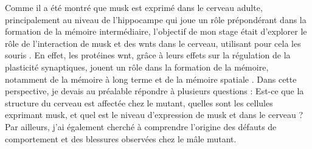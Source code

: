 	Comme il a été montré que \gls{musk} est exprimé dans le cerveau adulte, principalement au niveau de l'hippocampe \cite{Garcia-Osta2006} qui joue un rôle prépondérant dans la formation de la mémoire intermédiaire, l'objectif de mon stage était d'explorer le rôle de l'interaction de \gls{musk} et des \Glspl{wnt} dans le cerveau, utilisant pour cela les souris \mcrd. En effet, les protéines \gls{wnt}, grâce à leurs effets sur la régulation de la plasticité synaptiques, jouent un rôle dans la formation de la mémoire, notamment de la mémoire à long terme et de la mémoire spatiale \cite{Tan2013, Oliva2013a}. Dans cette perspective, je devais au préalable répondre à plusieurs questions : Est-ce que la structure du cerveau est affectée chez le mutant, quelles sont les cellules exprimant \gls{musk}, et quel est le niveau d'expression de \gls{musk} et \mcrd dans le cerveau ? Par ailleurs, j'ai également cherché à comprendre l'origine des défauts de comportement et des blessures observées chez le mâle mutant.